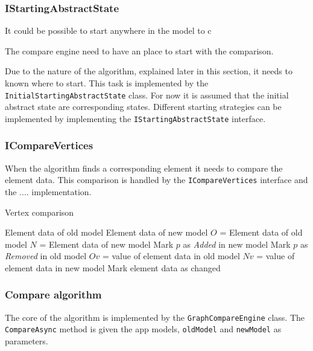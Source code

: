 \subsubsection{IStartingAbstractState}
It could be possible to start anywhere in the model to c


The compare engine need to have an place to start with the comparison. 


Due to the nature of the algorithm, explained later in this section, it needs to known where to start. This task is implemented by the \verb|InitialStartingAbstractState| class. For now it is assumed that the initial abstract state are corresponding states. Different starting strategies can be implemented by implementing the \verb|IStartingAbstractState| interface. 

\subsubsection{ICompareVertices}
When the algorithm finds a corresponding element it needs to compare the element data. This comparison is handled by the \verb|ICompareVertices| interface and the .... implementation.

\begin{algorithm}
    \caption{Vertex comparison}\label{alg:cap}
    \begin{algorithmic}
        \Require Element data of old model
        \Require Element data of new model
        \State $O$ = Element data of old model
        \State $N$ = Element data of new model
            \State Mark $p$ as \textit{Added} in new model
        \EndFor
            \State Mark $p$ as \textit{Removed} in old model
        \EndFor
            \State $Ov$ = value of element data in old model
            \State $Nv$ = value of element data in new model
               \State Mark element data as changed 
            \EndIf
        \EndFor
    \end{algorithmic}
\end{algorithm}



\subsubsection{Compare algorithm} \label{sec:compare-algorithm}
The core of the algorithm is implemented by the \verb|GraphCompareEngine| class. The \verb|CompareAsync| method is given the app models, \verb|oldModel| and \verb|newModel| as parameters. 

